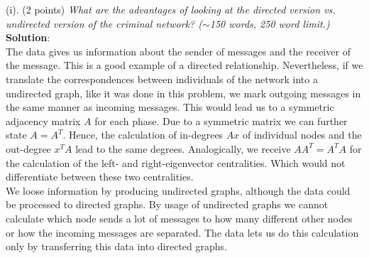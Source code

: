 (i). (2 points) \textsl{What are the advantages of looking at the directed version vs. undirected version of the criminal network? ($\sim$150 words, 250 word limit.)}\\

\textbf{Solution}:\\
The data gives us information about the sender of messages and the receiver of the message. This is a good example of a directed relationship. Nevertheless, if we translate the correspondences between individuals of the network into a undirected graph, like it was done in this problem, we mark outgoing messages in the same manner as incoming messages. This would lead us to a symmetric adjacency matrix $A$ for each phase. Due to a symmetric matrix we can further state $A = A^T$. Hence, the calculation of in-degrees $Ax$ of individual nodes and the out-degree $x^TA$ lead to the same degrees. Analogically, we receive $AA^T = A^TA$ for the calculation of the left- and right-eigenvector centralities. Which would not differentiate between these two centralities.\\

We loose information by producing undirected graphs, although the data could be processed to directed graphs. By usage of undirected graphs we cannot calculate which node sends a lot of messages to how many different other nodes or how the incoming messages are separated. The data lets us do this calculation only by transferring this data into directed graphs.\\